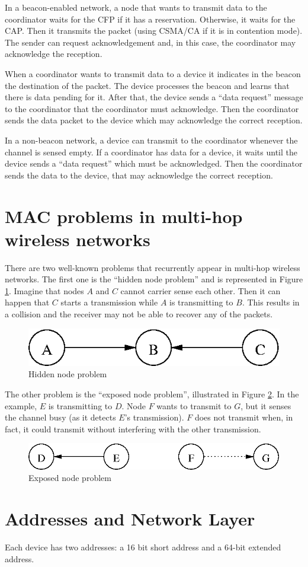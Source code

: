 In a beacon-enabled network, a node that wants to transmit data to the coordinator waits for the CFP if it has a reservation.
Otherwise, it waits for the CAP.
Then it transmits the packet (using CSMA/CA if it is in contention mode).
The sender can request acknowledgement and, in this case, the coordinator may acknowledge the reception.

When a coordinator wants to transmit data to a device it indicates in the beacon the destination of the packet.
The device processes the beacon and learns that there is data pending for it.
After that, the device sends a ``data request'' message to the coordinator that the coordinator must acknowledge.
Then the coordinator sends the data packet to the device which may acknowledge the correct reception.

In a non-beacon network, a device can transmit to the coordinator whenever the channel is sensed empty.
If a coordinator has data for a device, it waits until the device sends a ``data request'' which must be acknowledged.
Then the coordinator sends the data to the device, that may acknowledge the correct reception.

\section{MAC problems in multi-hop wireless networks}

There are two well-known problems that recurrently appear in multi-hop wireless networks.
The first one is the ``hidden node problem'' and is represented in Figure \ref{fig:hidden}.
Imagine that nodes $A$ and $C$ cannot carrier sense each other. 
Then it can happen that $C$ starts a transmission while $A$ is transmitting to $B$.
This results in a collision and the receiver may not be able to recover any of the packets.

\begin{figure}[htbp]
  \centering
  \includegraphics[height=0.1\linewidth]{figures/hidden.eps}
  \caption{Hidden node problem}
  \label{fig:hidden}
\end{figure}

The other problem is the ``exposed node problem'', illustrated in Figure \ref{fig:exposed}.
In the example, $E$ is transmitting to $D$.
Node $F$ wants to transmit to $G$, but it senses the channel busy (as it detects $E$'s transmission).
$F$ does not transmit when, in fact, it could transmit without interfering with the other transmission.
\begin{figure}[htbp]
  \centering
  \includegraphics[height=0.1\linewidth]{figures/exposed.eps}
  \caption{Exposed node problem}
  \label{fig:exposed}
\end{figure}

\section{Addresses and Network Layer}

Each device has two addresses: a 16 bit short address and a 64-bit extended address.
